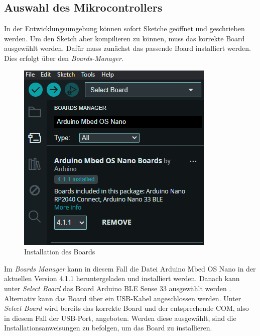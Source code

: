 \subsection{Auswahl des Mikrocontrollers}
In der Entwicklungsumgebung können sofort Sketche geöffnet und geschrieben werden. Um den Sketch aber kompilieren zu können, muss das korrekte Board ausgewählt werden.
Dafür muss zunächst das passende Board installiert werden. 
 Dies erfolgt über den \textit{Boards-Manager}.
\begin{figure}[htb]
	\begin{center}
		\includegraphics[width=\textwidth]{General/Boardsmanager}
		\caption{Installation des Boards} \label{Installation des Boards}
	\end{center}
\end{figure}
Im \textit{Boards Manager} kann in diesem Fall die Datei Arduino Mbed OS Nano in der aktuellen Version 4.1.1 heruntergeladen und installiert werden. Danach kann unter \textit{Select Board} das Board Arduino BLE Sense 33 ausgewählt werden \cite{Arduino.2024b}.
Alternativ kann das Board über ein USB-Kabel angeschlossen werden. Unter\textit{ Select Board} wird bereits das korrekte Board und der entsprechende COM, also in diesem Fall der USB-Port, angeboten. Werden diese ausgewählt, sind die Installationsanweisungen zu befolgen, um das Board zu installieren.

